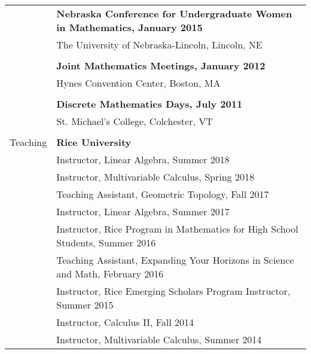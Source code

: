 \documentclass[letterpaper,11pt,oneside]{article}
\begin{document}
\begin{tabular}{@{} l l}
&\textbf{Nebraska Conference for Undergraduate Women in Mathematics, January 2015 } \\
     &  The University of Nebraska-Lincoln, Lincoln, NE \\
     & \\
     
&\textbf{Joint Mathematics Meetings, January 2012} \\
     &  Hynes Convention Center, Boston, MA \\
     & \\
     
     &\textbf{Discrete Mathematics Days, July 2011} \\
     &   St. Michael's College, Colchester, VT \\
     & \\
     
 
  \Large{Teaching}   & \textbf{Rice University} \\
     & Instructor, Linear Algebra, Summer 2018 \\
     & Instructor, Multivariable Calculus, Spring 2018 \\   
     & Teaching Assistant, Geometric Topology, Fall 2017 \\
     & Instructor, Linear Algebra, Summer 2017 \\
     & Instructor, Rice Program in Mathematics
for High School Students, Summer 2016 \\
  & Teaching Assistant,  Expanding Your Horizons in Science and Math, February 2016 \\
    & Instructor,  Rice Emerging Scholars Program Instructor, Summer 2015 \\
     & Instructor, Calculus II, Fall 2014 \\
     & Instructor, Multivariable Calculus, Summer 2014 \\   
        \end{tabular}
     
\end{document}
